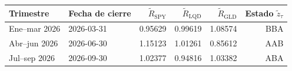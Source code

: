 {\small
\begin{tabular}{llrrrr}
\toprule
Trimestre & Fecha de cierre & $\tilde R_{\mathrm{SPY}}$ & $\tilde R_{\mathrm{LQD}}$ & $\tilde R_{\mathrm{GLD}}$ & Estado $\tilde z_\tau$ \\
\midrule
Ene–mar 2026 & 2026-03-31 & 0.95629 & 0.99619 & 1.08574 & BBA \\
Abr–jun 2026 & 2026-06-30 & 1.15123 & 1.01261 & 0.85612 & AAB \\
Jul–sep 2026 & 2026-09-30 & 1.02377 & 0.94816 & 1.03382 & ABA \\
\bottomrule
\end{tabular}
}
